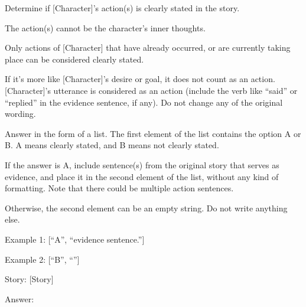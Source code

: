 \begin{tcolorbox}[
    breakable,
    colframe=green!40!black,
    colback=green!5,
    coltitle=white,
    fonttitle=\bfseries,
    title=Extracting actions,
    colbacktitle=green!40!black
]
Determine if [Character]'s action(s) is clearly stated in the story.

The action(s) cannot be the character's inner thoughts.

Only actions of [Character] that have already occurred, or are currently taking place can be considered clearly stated.

If it's more like [Character]'s desire or goal, it does not count as an action. [Character]'s utterance is considered as an action (include the verb like ``said'' or ``replied'' in the evidence sentence, if any). Do not change any of the original wording.

Answer in the form of a list. The first element of the list contains the option A or B. A means clearly stated, and B means not clearly stated.

If the answer is A, include sentence(s) from the original story that serves as evidence, and place it in the second element of the list, without any kind of formatting. Note that there could be multiple action sentences.

Otherwise, the second element can be an empty string. Do not write anything else.

Example 1: [``A'', ``evidence sentence.'']

Example 2: [``B'', ``''] \newline

Story: [Story]

Answer: 
\end{tcolorbox}



